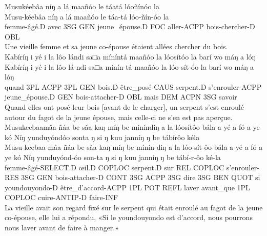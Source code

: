 \documentclass[a4paper,11pt]{article}
\begin{document}
\ea
\glll
Musukéebâa níŋ a lá maañóo le táatá lóoñínóo la\\
Musu-kéebâa níŋ a lá maañóo le táa-tá lóo-ñín-óo la\\
femme-âgé.D avec 3SG GEN jeune\_épouse.D FOC aller-ACPP bois-chercher-D OBL\\
\glt{} Une vieille femme et sa jeune co-épouse étaient allées chercher du bois.\\
\z
\ea
\glll
Kabíríŋ i yé i la lôo lándi sa□a míníntá maañóo la lóosítóo la barí wo máŋ a lóŋ\\
Kabíríŋ i yé i la lôo lá-ndi sa□a mínín-tá maañóo la lóo-sít-óo la barí wo máŋ a lóŋ\\
quand 3PL ACPP 3PL GEN bois.D être\_posé-CAUS serpent.D s’enrouler-ACPP jeune\_épouse.D GEN bois-attacher-D OBL mais DEM ACPN 3SG savoir\\
\glt{} Quand elles ont posé leur bois [avant de le charger], un serpent s’est enroulé autour du fagot de la jeune épouse, mais celle-ci ne s’en est pas aperçue.\\
\z
\ea
\glll
Musukeebaamâa ñáa be sǎa kaŋ míŋ be míníndiŋ a la lóosítôo bála a yé a fó a ye kó Níŋ yunduyóndóo sonta ŋ si ŋ kuu janníŋ ŋ be tábírôo kéla\\
Musu-keebaa-mâa ñáa be sǎa kaŋ míŋ be mínín-diŋ a la lóo-sít-ôo bála a yé a fó a ye kó Níŋ yunduyónd-óo son-ta ŋ si ŋ kuu janníŋ ŋ be tábí-r-ôo ké-la\\
femme-âgé-SELECT.D œil.D COPLOC serpent.D sur REL COPLOC s’enrouler-RES 3SG GEN bois-attacher-D CONT 3SG ACPP 3SG dire 3SG BEN QUOT si youndouyondo-D être\_d’accord-ACPP 1PL POT REFL laver avant\_que 1PL COPLOC cuire-ANTIP-D faire-INF\\
\glt{} La vieille avait son regard fixé sur le serpent qui était enroulé au fagot de la jeune co-épouse, elle lui a répondu, «Si le youndouyondo est d’accord, nous pourrons nous laver avant de faire à manger.»\\
\z
\end{document}
